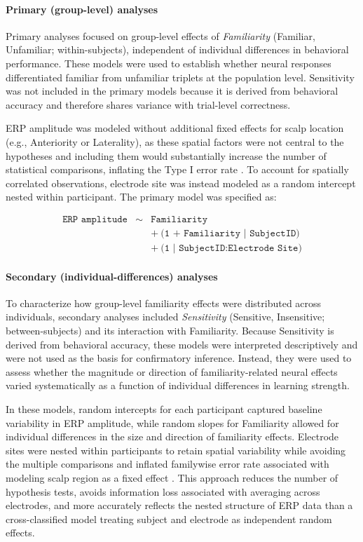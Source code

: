 \paragraph{Primary (group-level) analyses}
Primary analyses focused on group-level effects of \textit{Familiarity} (Familiar, Unfamiliar; within-subjects), independent of individual differences in behavioral performance. These models were used to establish whether neural responses differentiated familiar from unfamiliar triplets at the population level. Sensitivity was not included in the primary models because it is derived from behavioral accuracy and therefore shares variance with trial-level correctness.

ERP amplitude was modeled without additional fixed effects for scalp location (e.g., Anteriority or Laterality), as these spatial factors were not central to the hypotheses and including them would substantially increase the number of statistical comparisons, inflating the Type I error rate \cite{luckHowGetStatistically2017}. To account for spatially correlated observations, electrode site was instead modeled as a random intercept nested within participant. The primary model was specified as:

\begin{eqnarray}
	\texttt{ERP amplitude} &\sim& 
	\texttt{Familiarity} \nonumber \\
	&& +\ \texttt{(1 + Familiarity | SubjectID)} \nonumber \\
	&& +\ \texttt{(1 | SubjectID:Electrode Site)}
\end{eqnarray}

\paragraph{Secondary (individual-differences) analyses}
To characterize how group-level familiarity effects were distributed across individuals, secondary analyses included \textit{Sensitivity} (Sensitive, Insensitive; between-subjects) and its interaction with Familiarity. Because Sensitivity is derived from behavioral accuracy, these models were interpreted descriptively and were not used as the basis for confirmatory inference. Instead, they were used to assess whether the magnitude or direction of familiarity-related neural effects varied systematically as a function of individual differences in learning strength.

In these models, random intercepts for each participant captured baseline variability in ERP amplitude, while random slopes for Familiarity allowed for individual differences in the size and direction of familiarity effects. Electrode sites were nested within participants to retain spatial variability while avoiding the multiple comparisons and inflated familywise error rate associated with modeling scalp region as a fixed effect \cite{luckHowGetStatistically2017}. This approach reduces the number of hypothesis tests, avoids information loss associated with averaging across electrodes, and more accurately reflects the nested structure of ERP data than a cross-classified model treating subject and electrode as independent random effects.

